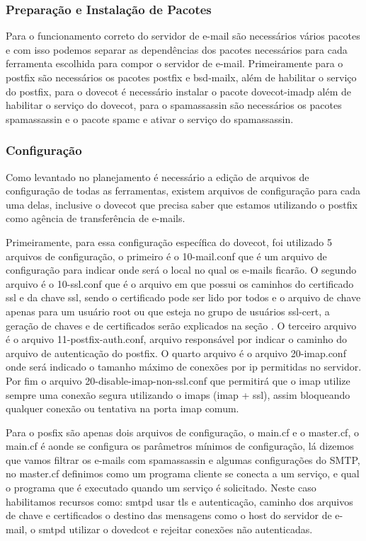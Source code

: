 \subsubsection{Preparação e Instalação de Pacotes }

Para o funcionamento correto do servidor de e-mail são necessários vários pacotes
e com isso podemos separar as dependências dos pacotes necessários para cada ferramenta
escolhida para compor o servidor de e-mail. Primeiramente para o postfix são necessários
os pacotes postfix e bsd-mailx, além de habilitar o serviço do postfix, para o dovecot
é necessário instalar o pacote dovecot-imadp além de habilitar o serviço do dovecot,
para o spamassassin são necessários os pacotes spamassassin e o pacote spamc e ativar
o serviço do spamassassin.

\subsubsection{Configuração}

Como levantado no planejamento é necessário a edição de arquivos de configuração
de todas as ferramentas, existem arquivos de configuração para cada uma delas, inclusive
o dovecot que precisa saber que estamos utilizando o postfix como agência de transferência
de e-mails.

Primeiramente, para essa configuração específica do dovecot, foi utilizado 5 arquivos
de configuração, o primeiro é o 10-mail.conf que é um arquivo de configuração para
indicar onde será o local no qual os e-mails ficarão. O segundo arquivo é o 10-ssl.conf
que é o arquivo em que possui os caminhos do certificado ssl e da chave ssl, sendo o
certificado pode ser lido por todos e o arquivo de chave apenas para um usuário root
ou que esteja no grupo de usuários ssl-cert, a geração de chaves e de certificados serão
explicados na seção %
. O terceiro arquivo é o arquivo
11-postfix-auth.conf, arquivo responsável por indicar o caminho do arquivo de autenticação
do postfix. O quarto arquivo é o arquivo 20-imap.conf onde será indicado o tamanho
máximo de conexões por ip permitidas no servidor. Por fim o arquivo
20-disable-imap-non-ssl.conf que permitirá que o imap utilize sempre uma conexão
segura utilizando o imaps (imap + ssl), assim bloqueando qualquer conexão ou
tentativa na porta imap comum.

Para o posfix são apenas dois arquivos de configuração, o main.cf e o master.cf,
o main.cf é aonde se configura os parâmetros mínimos de configuração, lá dizemos
que vamos filtrar os e-mails com spamassassin e algumas configurações do SMTP, no
master.cf definimos como um programa cliente se conecta a um serviço, e qual o
programa que é executado quando um serviço é solicitado. Neste caso habilitamos
recursos como: smtpd usar tls e autenticação, caminho dos arquivos de chave e certificados
o destino das mensagens como o host do servidor de e-mail, o smtpd utilizar o dovedcot
e rejeitar conexões não autenticadas.

